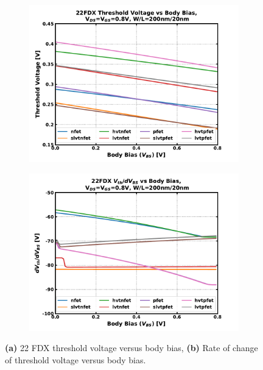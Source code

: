 		\begin{figure}[htb!]
		    \centering
		    \begin{subfigure}{0.5\textwidth}
		        \centering
		        \includegraphics[width=1\textwidth, angle=0]{./figs/design/vth_vbs}
		        \caption{ }
		        \label{fig:vth_vs_vbs}
		    \end{subfigure}%
		    \begin{subfigure}{0.5\textwidth}
		        \centering
		        \includegraphics[width=1\textwidth, angle=0]{./figs/design/vth_slope_vbs}
		        \caption{ }
		        \label{fig:vth_slope_vs_vbs}
		    \end{subfigure}
		    \label{fig:vth_groupa}
		    \caption{\textbf{(a)} 22 FDX threshold voltage versus body bias, \textbf{(b)} Rate of change of threshold voltage versus body bias.}
		\end{figure} 


